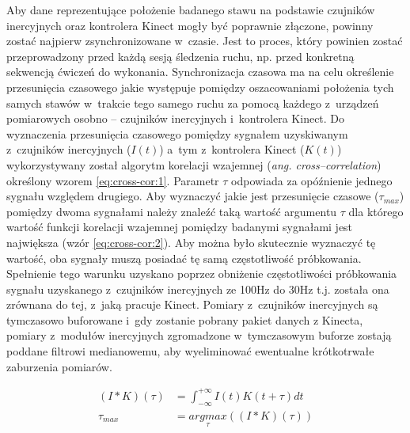 Aby dane reprezentujące położenie badanego stawu na podstawie czujników inercyjnych oraz kontrolera Kinect mogły być poprawnie złączone, powinny zostać najpierw zsynchronizowane w~czasie. Jest to proces, który powinien zostać przeprowadzony przed każdą sesją śledzenia ruchu, np. przed konkretną sekwencją ćwiczeń do wykonania. Synchronizacja czasowa ma na celu określenie przesunięcia czasowego jakie występuje pomiędzy oszacowaniami położenia tych samych stawów w~trakcie tego samego ruchu za pomocą każdego z~urządzeń pomiarowych osobno -- czujników inercyjnych i~kontrolera Kinect. Do wyznaczenia przesunięcia czasowego pomiędzy sygnałem uzyskiwanym z~czujników inercyjnych ($I(t)$) a~tym z~kontrolera Kinect ($K(t)$) wykorzystywany został algorytm korelacji wzajemnej (\emph{ang. cross--correlation}) określony wzorem \eqref{eq:cross-cor:1}. Parametr $\tau$ odpowiada za opóźnienie jednego sygnału względem drugiego. Aby wyznaczyć jakie jest przesunięcie czasowe ($\tau_{max}$) pomiędzy dwoma sygnałami należy znaleźć taką wartość argumentu $\tau$ dla którego wartość funkcji korelacji wzajemnej pomiędzy badanymi sygnałami jest największa (wzór \eqref{eq:cross-cor:2}). Aby można było skutecznie wyznaczyć tę wartość, oba sygnały muszą posiadać tę samą częstotliwość próbkowania. Spełnienie tego warunku uzyskano poprzez obniżenie częstotliwości próbkowania sygnału uzyskanego z~czujników inercyjnych ze 100Hz  do 30Hz t.j. została ona zrównana do tej, z~jaką pracuje Kinect. Pomiary z~czujników inercyjnych są tymczasowo buforowane i~gdy zostanie pobrany pakiet danych 
z Kinecta, pomiary z~modułów inercyjnych zgromadzone w~tymczasowym buforze 
zostają poddane filtrowi medianowemu, aby wyeliminować ewentualne krótkotrwałe zaburzenia pomiarów. 

\begin{subequations}
	\begin{align}
		(I \ast K)(\tau) & = \int_{-\infty}^{+\infty}I(t)K(t+\tau)dt\label{eq:cross-cor:1}   \\
		\tau_{max}       & = \underset{\tau}{argmax}((I \ast K)(\tau))\label{eq:cross-cor:2} 
	\end{align}
	\label{eq:cross-cor}
\end{subequations}

